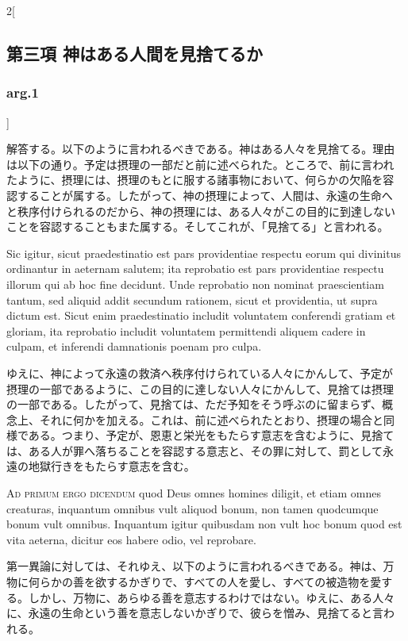 \documentclass[paper=a4paper,fontsize=10pt,jafontsize=9pt,titlepage]{jlreq}
\begin{document}
\begin{paracol}{2}[\subsection{第三項 神はある人間を見捨てるか}\subsubsection{arg.1}]
\switchcolumn


解答する。以下のように言われるべきである。神はある人々を見捨てる。理由
は以下の通り。予定は摂理の一部だと前に述べられた。ところで、前に言われ
たように、摂理には、摂理のもとに服する諸事物において、何らかの欠陥を容
認することが属する。したがって、神の摂理によって、人間は、永遠の生命へ
と秩序付けられるのだから、神の摂理には、ある人々がこの目的に到達しない
ことを容認することもまた属する。そしてこれが、「見捨てる」と言われる。


\switchcolumn*


Sic igitur, sicut praedestinatio est
pars providentiae respectu eorum qui divinitus ordinantur in aeternam
salutem; ita reprobatio est pars providentiae respectu illorum qui ab
hoc fine decidunt. Unde reprobatio non nominat praescientiam tantum, sed
aliquid addit secundum rationem, sicut et providentia, ut supra dictum
est. Sicut enim praedestinatio includit voluntatem conferendi gratiam et
gloriam, ita reprobatio includit voluntatem permittendi aliquem cadere
in culpam, et inferendi damnationis poenam pro culpa.


\switchcolumn


ゆえに、神によって永遠の救済へ秩序付けられている人々にかんして、予定が
摂理の一部であるように、この目的に達しない人々にかんして、見捨ては摂理
の一部である。したがって、見捨ては、ただ予知をそう呼ぶのに留まらず、概
念上、それに何かを加える。これは、前に述べられたとおり、摂理の場合と同
様である。つまり、予定が、恩恵と栄光をもたらす意志を含むように、見捨て
は、ある人が罪へ落ちることを容認する意志と、その罪に対して、罰として永
遠の地獄行きをもたらす意志を含む。


\switchcolumn*[\subsubsection{ad.1}]


{\scshape Ad primum ergo dicendum} quod Deus omnes
homines diligit, et etiam omnes creaturas, inquantum omnibus vult
aliquod bonum, non tamen quodcumque bonum vult omnibus. Inquantum igitur
quibusdam non vult hoc bonum quod est vita aeterna, dicitur eos habere
odio, vel reprobare.


\switchcolumn


第一異論に対しては、それゆえ、以下のように言われるべきである。神は、万
物に何らかの善を欲するかぎりで、すべての人を愛し、すべての被造物を愛す
る。しかし、万物に、あらゆる善を意志するわけではない。ゆえに、ある人々
に、永遠の生命という善を意志しないかぎりで、彼らを憎み、見捨てると言わ
れる。



\end{paracol}
\end{document}
